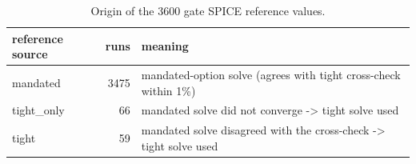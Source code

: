 \begin{table}[H]
\centering
{\small
\begin{tabular}{lrl}
\toprule
reference source & runs & meaning \\
\midrule
mandated & 3475 & mandated-option solve (agrees with tight cross-check within 1\%) \\
tight\_only & 66 & mandated solve did not converge -> tight solve used \\
tight & 59 & mandated solve disagreed with the cross-check -> tight solve used \\
\bottomrule
\end{tabular}
}
\caption{Origin of the 3600 gate SPICE reference values.}
\label{tab:ref}
\end{table}

